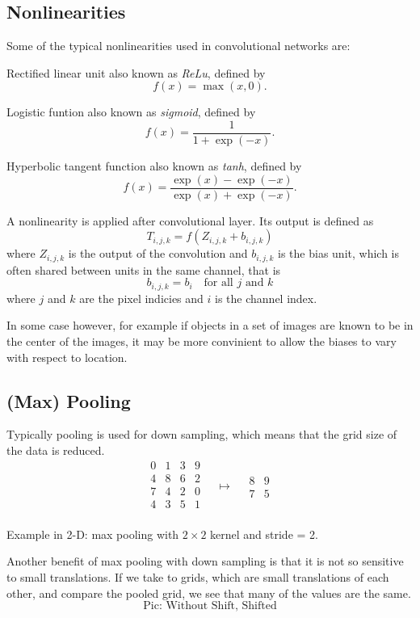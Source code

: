 \documentclass[]{article}
\begin{document}
\subsection{Nonlinearities}
Some of the typical nonlinearities used in convolutional networks are:

Rectified linear unit also known as \emph{ReLu}, defined by
\[
f(x) = \max(x, 0).
\]

Logistic funtion also known as \emph{sigmoid}, defined by
\[
f(x) = \frac{1}{1 + \exp(-x)}.
\]

Hyperbolic tangent function also known as \emph{tanh}, defined by
\[
f(x) = \frac{\exp(x) - \exp(-x)}{\exp(x) + \exp(-x)}.
\]

A nonlinearity is applied after convolutional layer. Its output is defined as
\[
T_{i,j,k} = f(Z_{i, j, k} + b_{i,j,k})
\]
where $Z_{i, j, k}$ is the output of the convolution and $b_{i, j, k}$ is the bias
unit, which is often shared between units in the same channel, that is
\[
b_{i, j, k} = b_i \quad \text{for all $j$ and $k$}
\]
where $j$ and $k$ are the pixel indicies and $i$ is the channel index.

In some case however, for example if objects in a set of images are known to be
in the center of the images, it may be more convinient to allow the biases to vary
with respect to location.

\subsection{(Max) Pooling}
Typically pooling is used for down sampling, which means that the grid size of
the data is reduced.
\[
\begin{array}{c|c|c|c}
  0 & 1 & 3 & 9\\
  \hline
  4 & 8 & 6 & 2\\
  \hline
  7 & 4 & 2 & 0\\
  \hline
  4 & 3 & 5 & 1\\
 \end{array}
 \quad \mapsto \quad
 \begin{array}{c|c}
   8 & 9\\
   \hline
   7 & 5
  \end{array}
 \]
\begin{center}Example in 2-D: max pooling with $2\times2$ kernel and stride = 2.\end{center}
Another benefit of max pooling with down sampling is that it is not so sensitive
to small translations. If we take to grids, which are small translations of each
other, and compare the pooled grid, we see that many of the values are the same.
\[
\text{Pic: Without Shift, Shifted}
\]
\end{document}

